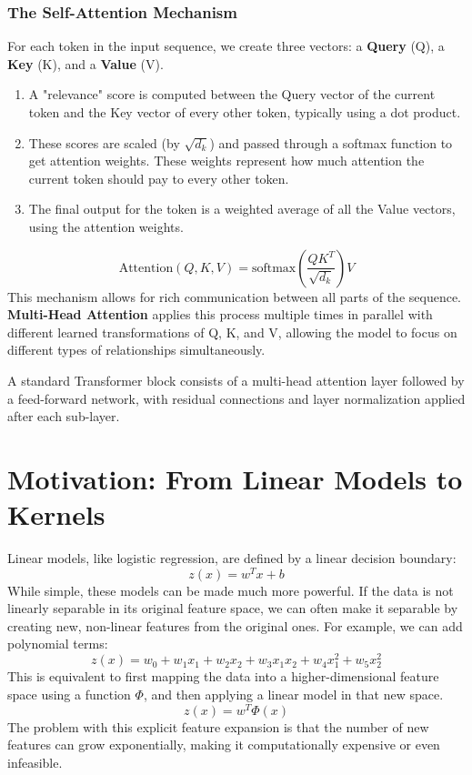 \documentclass{article}
\begin{document}
\begin{multicols}{2}
	\subsubsection{The Self-Attention Mechanism}
	For each token in the input sequence, we create three vectors: a \textbf{Query} (Q), a \textbf{Key} (K), and a \textbf{Value} (V).
	\begin{enumerate}
		\item A "relevance" score is computed between the Query vector of the current token and the Key vector of every other token, typically using a dot product.
		\item These scores are scaled (by $\sqrt{d_k}$) and passed through a softmax function to get attention weights. These weights represent how much attention the current token should pay to every other token.
		\item The final output for the token is a weighted average of all the Value vectors, using the attention weights.
	\end{enumerate}
	$$ \text{Attention}(Q, K, V) = \text{softmax}\left(\frac{QK^T}{\sqrt{d_k}}\right)V $$
	This mechanism allows for rich communication between all parts of the sequence. \textbf{Multi-Head Attention} applies this process multiple times in parallel with different learned transformations of Q, K, and V, allowing the model to focus on different types of relationships simultaneously.

	A standard Transformer block consists of a multi-head attention layer followed by a feed-forward network, with residual connections and layer normalization applied after each sub-layer.

	\section{Motivation: From Linear Models to Kernels}
	Linear models, like logistic regression, are defined by a linear decision boundary:
	$$ z(x) = w^T x + b $$
	While simple, these models can be made much more powerful. If the data is not linearly separable in its original feature space, we can often make it separable by creating new, non-linear features from the original ones. For example, we can add polynomial terms:
	$$ z(x) = w_0 + w_1 x_1 + w_2 x_2 + w_3 x_1 x_2 + w_4 x_1^2 + w_5 x_2^2 $$
	This is equivalent to first mapping the data into a higher-dimensional feature space using a function $\Phi$, and then applying a linear model in that new space.
	$$ z(x) = w^T \Phi(x) $$
	The problem with this explicit feature expansion is that the number of new features can grow exponentially, making it computationally expensive or even infeasible.


\end{multicols}
\end{document}
